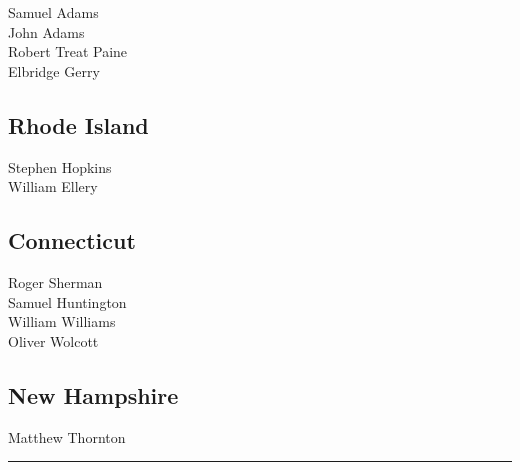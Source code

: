 \documentclass[a4paper,landscape,10pt]{article}
\begin{document}
\begin{multicols}{7}
Samuel Adams\\
John Adams\\
Robert Treat Paine\\
Elbridge Gerry


\subsection*{Rhode Island}

Stephen Hopkins\\
William Ellery



\subsection*{Connecticut}

Roger Sherman\\
Samuel Huntington\\
William Williams\\
Oliver Wolcott

\subsection*{New Hampshire}

Matthew Thornton
\end{multicols}

\hrule

{}
\end{document}
